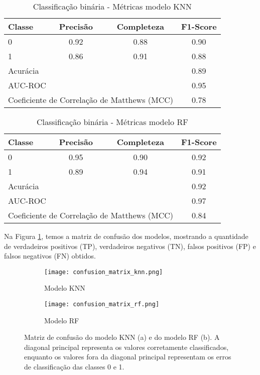\begin{table}[!ht]
    \centering
    \caption{Classificação binária - Métricas modelo KNN}
    \begin{tabular}{lccc}
        \toprule
        Classe & Precisão & Completeza & F1-Score \\
        \midrule
        0 & 0.92 & 0.88 & 0.90 \\
        1 & 0.86 & 0.91 & 0.88 \\
        \midrule
        \multicolumn{3}{l}{Acurácia} & 0.89 \\
        \multicolumn{3}{l}{AUC-ROC} & 0.95 \\
        \multicolumn{3}{l}{Coeficiente de Correlação de Matthews (MCC)} & 0.78 \\
        \bottomrule
    \end{tabular}
    \label{metricas_modelo_knn}
\end{table}


\begin{table}[!ht]
    \centering
    \caption{Classificação binária - Métricas modelo RF}
    \begin{tabular}{lccc}
        \toprule
        Classe & Precisão & Completeza & F1-Score \\
        \midrule
        0 & 0.95 & 0.90 & 0.92 \\
        1 & 0.89 & 0.94 & 0.91 \\
        \midrule
        \multicolumn{3}{l}{Acurácia} & 0.92 \\
        \multicolumn{3}{l}{AUC-ROC} & 0.97 \\
        \multicolumn{3}{l}{Coeficiente de Correlação de Matthews (MCC)} & 0.84 \\
        \bottomrule
    \end{tabular}
    \label{metricas_modelo_rf}
\end{table}

Na Figura \ref{confusion_matrix}, temos a matriz de confusão dos modelos, mostrando a quantidade de verdadeiros positivos (TP), verdadeiros negativos (TN), falsos positivos (FP) e falsos negativos (FN) obtidos.

\begin{figure}[!ht]
    \centering
    \captionsetup{justification=centering}
    \begin{subfigure}[b]{0.45\textwidth}
        \texttt{[image: confusion\_matrix\_knn.png]}
        \caption{Modelo KNN}
    \end{subfigure}
    \begin{subfigure}[b]{0.45\textwidth}
        \texttt{[image: confusion\_matrix\_rf.png]}
        \caption{Modelo RF}
    \end{subfigure}
    \caption{Matriz de confusão do modelo KNN (a) e do modelo RF (b). A diagonal principal representa os valores corretamente classificados, enquanto os valores fora da diagonal principal representam os erros de classificação das classes 0 e 1.}
    \label{confusion_matrix}
\end{figure}

